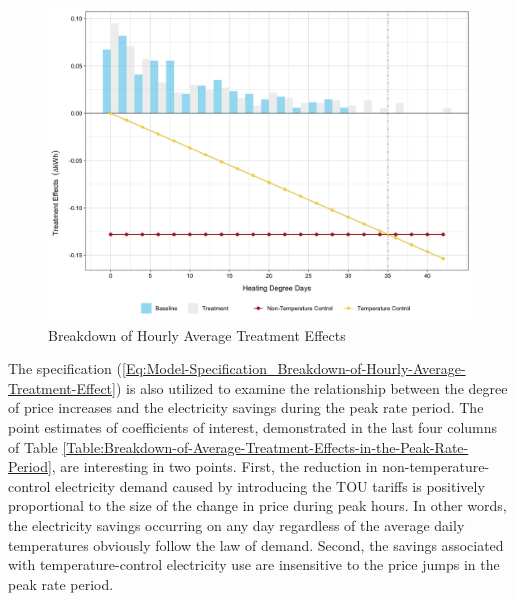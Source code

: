 \begin{figure}[!th]
\centering
\includegraphics[scale = 0.16]{03_Chapter-2/00A_Figures/Figure_Breakdown-of-Hourly-ATEs-in-the-Peak-Rate-Period.png}
\caption{Breakdown of Hourly Average Treatment Effects}
\label{Figure:Breakdown-of-Hourly-ATEs-in-the-Peak-Rate-Period}
\end{figure}

The specification (\ref{Eq:Model-Specification_Breakdown-of-Hourly-Average-Treatment-Effect}) is also utilized to examine the relationship between the degree of price increases and the electricity savings during the peak rate period. The point estimates of coefficients of interest, demonstrated in the last four columns of Table \ref{Table:Breakdown-of-Average-Treatment-Effects-in-the-Peak-Rate-Period}, are interesting in two points. First, the reduction in non-temperature-control electricity demand caused by introducing the TOU tariffs is positively proportional to the size of the change in price during peak hours. In other words, the electricity savings occurring on any day regardless of the average daily temperatures obviously follow the law of demand. Second, the savings associated with temperature-control electricity use are insensitive to the price jumps in the peak rate period. 


